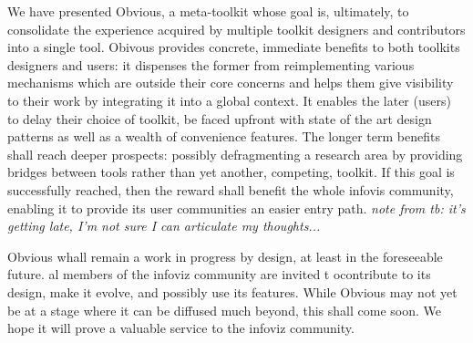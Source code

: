 
We have presented Obvious, a meta-toolkit whose goal is, ultimately, to consolidate the experience acquired by multiple toolkit designers and contributors into a single tool. Obivous provides concrete, immediate benefits to both toolkits designers and users: it dispenses the former from reimplementing various mechanisms which are outside their core concerns and helps them give visibility to their work by integrating it into a global context. It enables the later (users) to delay their choice of toolkit, be faced upfront with state of the art design patterns as well as a wealth of convenience features. The longer term benefits shall reach deeper prospects: possibly defragmenting a research area by providing bridges between tools rather than yet another, competing, toolkit. If this goal is successfully reached, then the reward shall benefit the whole infovis community, enabling it to provide its user communities an easier entry path. \emph{note from tb: it's getting late, I'm not sure I can articulate my thoughts...}

Obvious whall remain a work in progress by design, at least in the foreseeable future. al members of the infoviz community are invited t ocontribute to its design, make it evolve, and possibly use its features. While Obvious may not yet be at a stage where it can be diffused much beyond, this shall come soon. We hope it will prove a valuable service to the infoviz community. 
